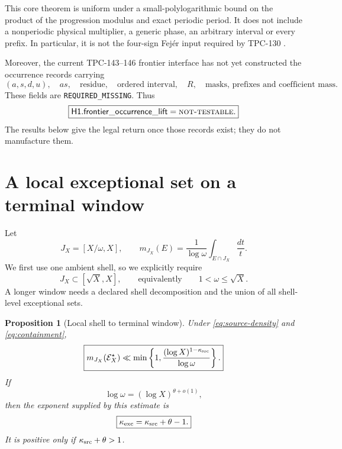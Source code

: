 \documentclass[11pt]{article}
\newtheorem{proposition}[theorem]{Proposition}
\theoremstyle{definition}
\theoremstyle{remark}
\newcommand{\NT}{\textnormal{\textsc{not-testable}}}
\begin{document}
This core theorem is uniform under a small-polylogarithmic bound on
the product of the progression modulus and exact periodic period.
It does not include a nonperiodic physical multiplier, a generic
phase, an arbitrary interval or every prefix.  In particular, it is
not the four-sign Fej\'er input required by TPC-130
\citep{WangTPC130}.

Moreover, the current TPC-143--146 frontier interface has not yet
constructed the occurrence records carrying
\[
 (a,s,d,u),\quad as,\quad\text{residue},\quad\text{ordered interval},
 \quad R,\quad\text{masks, prefixes and coefficient mass}.
\]
These fields are \texttt{REQUIRED\_MISSING}.  Thus
\begin{equation}
 \boxed{\mathsf{H1.frontier\_occurrence\_lift}=\NT.}
\label{eq:first-missing}
\end{equation}
The results below give the legal return once those records exist;
they do not manufacture them.

\section{A local exceptional set on a terminal window}

Let
\[
 J_X=[X/\omega,X],
 \qquad
 m_{J_X}(E)
 =
 \frac1{\log\omega}\int_{E\cap J_X}\frac{dt}{t}.
\]
We first use one ambient shell, so we explicitly require
\begin{equation}
 J_X\subset[\sqrt X,X],
 \qquad\text{equivalently}\qquad 1<\omega\le\sqrt X.
\label{eq:containment}
\end{equation}
A longer window needs a declared shell decomposition and the union
of all shell-level exceptional sets.

\begin{proposition}[Local shell to terminal window]
\label{prop:window}
Under \eqref{eq:source-density} and \eqref{eq:containment},
\begin{equation}
 \boxed{
 m_{J_X}(\mathcal E_X^\star)
 \ll
 \min\left\{
 1,\frac{(\log X)^{1-\kappa_{\rm src}}}{\log\omega}
 \right\}.}
\label{eq:window}
\end{equation}
If
\begin{equation}
 \log\omega=(\log X)^{\theta+o(1)},
\label{eq:theta}
\end{equation}
then the exponent supplied by this estimate is
\begin{equation}
 \boxed{\kappa_{\rm exc}
 =\kappa_{\rm src}+\theta-1.}
\label{eq:exception-exponent}
\end{equation}
It is positive only if \(\kappa_{\rm src}+\theta>1\).
\end{proposition}
\end{document}
